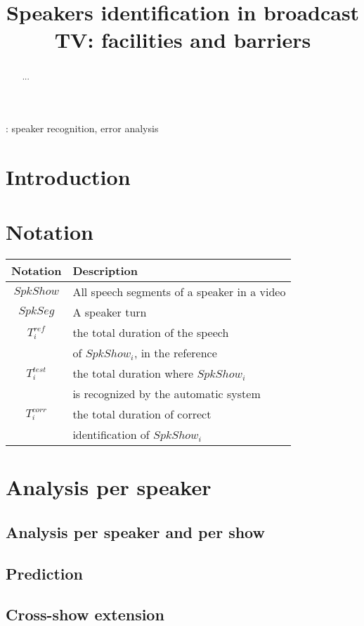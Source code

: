 \documentclass[a4paper]{article}
\title{Speakers identification in broadcast TV: facilities and barriers}
\begin{document}
\maketitle
%
\begin{abstract}
...
\end{abstract}
: speaker recognition, error analysis


\section{Introduction}

\section{\label{notation}Notation}

\begin{tabular}{|c|l|}
\hline 
Notation & Description \\ 
\hline 
\hline
$SpkShow$ & All speech segments of a speaker in a video \\ 
$SpkSeg$  & A speaker turn \\
$T^{ref}_i$ & the total duration of the speech\\
& of  $SpkShow_i$, in the reference \\
$T^{test}_i$ & the total duration where $SpkShow_i$\\
& is recognized by the automatic system\\
$T^{corr}_i$ & the total duration of correct\\
& identification of $SpkShow_i$\\

\hline 
\end{tabular} 

 


\section{Analysis per speaker}

\subsection{Analysis per speaker and per show}

\subsection{Prediction}

\subsection{Cross-show extension}
\end{document}

